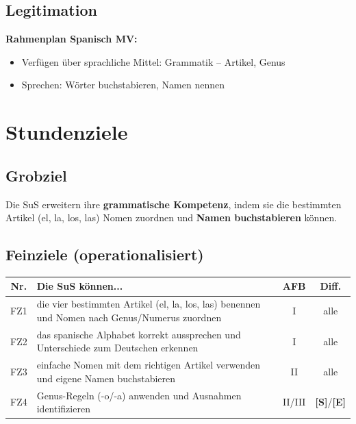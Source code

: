 \documentclass[11pt,a4paper]{article}
\newcommand{\Std}{\textcolor{standard}{\textbf{[S]}}}
\newcommand{\E}{\textcolor{erweiterung}{\textbf{[E]}}}
\begin{document}
\subsection{Legitimation}
\textbf{Rahmenplan Spanisch MV:}
\begin{itemize}
    \item Verfügen über sprachliche Mittel: Grammatik -- Artikel, Genus
    \item Sprechen: Wörter buchstabieren, Namen nennen
\end{itemize}

\section{Stundenziele}

\subsection{Grobziel}
Die SuS erweitern ihre \textbf{grammatische Kompetenz}, indem sie die bestimmten Artikel (el, la, los, las) Nomen zuordnen und \textbf{Namen buchstabieren} können.

\subsection{Feinziele (operationalisiert)}
\begin{tabular}{|c|p{8cm}|c|c|}
\hline
\textbf{Nr.} & \textbf{Die SuS können...} & \textbf{AFB} & \textbf{Diff.} \\
\hline
FZ1 & die vier bestimmten Artikel (el, la, los, las) benennen und Nomen nach Genus/Numerus zuordnen & I & alle \\
\hline
FZ2 & das spanische Alphabet korrekt aussprechen und Unterschiede zum Deutschen erkennen & I & alle \\
\hline
FZ3 & einfache Nomen mit dem richtigen Artikel verwenden und eigene Namen buchstabieren & II & alle \\
\hline
FZ4 & Genus-Regeln (-o/-a) anwenden und Ausnahmen identifizieren & II/III & \Std{}/\E{} \\
\hline
\end{tabular}

\end{document}
